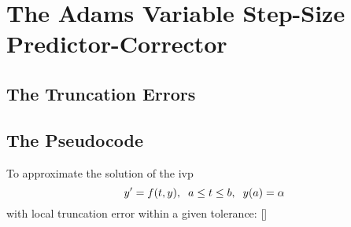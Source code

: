 \documentclass[12pt,oneside]{book}
\begin{document}
		\clearpage
	\section{The Adams Variable Step-Size Predictor-Corrector} \label{m:abpcvs}
		\begin{spacing}{1.2}
			
			
			
			\subsection*{The Truncation Errors}
			
			
			\subsection*{The Pseudocode}
				To approximate the solution of the \ac{ivp} 
				\[ y' = f(t,y), \hspace*{0.2cm} a \leq t \leq b, \hspace*{0.2cm} y(a) = \alpha \]
				with local truncation error within a given tolerance: []
				

\end{spacing}
\end{document}
